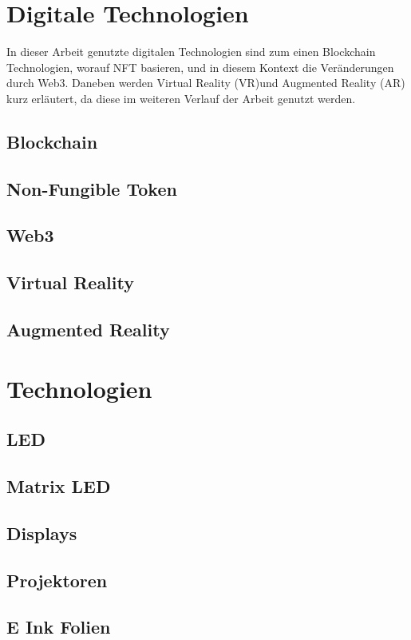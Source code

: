 \section{Digitale Technologien}
In dieser Arbeit genutzte digitalen Technologien sind zum einen Blockchain Technologien, worauf NFT basieren, und in diesem Kontext die Veränderungen durch Web3. Daneben werden Virtual Reality (VR)und Augmented Reality (AR) kurz erläutert, da diese im weiteren Verlauf der Arbeit genutzt werden.
\subsection{Blockchain}

\subsection{Non-Fungible Token}
\subsection{Web3}
\subsection{Virtual Reality}
\subsection{Augmented Reality}
\section{Technologien}
\subsection{LED}
\subsection{Matrix LED}
\subsection{Displays}
\subsection{Projektoren}
\subsection{E Ink Folien}
